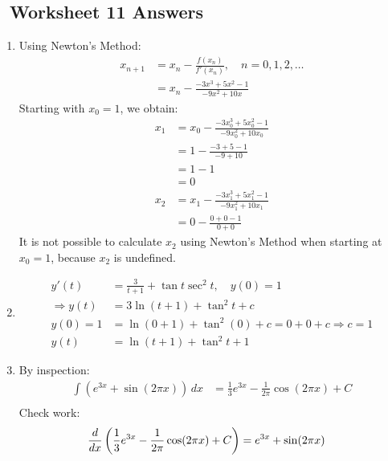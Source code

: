 \newpage\subsection*{\Course \ Worksheet 11 Answers}
\begin{enumerate}
    
    \item Using Newton's Method:
    \begin{align*} 
    	x_{n+1} &= x_n - \frac{f(x_n)}{f'(x_n)}, \quad n= 0, 1, 2, \ldots \\
        &= x_n - \frac{-3x^3+5x^2-1}{-9x^2+10x}
    \end{align*}
    Starting with $x_0 = 1$, we obtain: 
    \begin{align*} 
    	x_{1} 
        &= x_0 - \frac{-3x_0^3+5x_0^2-1}{-9x_0^2+10x_0} \\
        &= 1 - \frac{-3+5-1}{-9+10} \\
        &= 1 - 1 \\
        &= 0\\
        x_2
        &= x_1 - \frac{-3x_1^3+5x_1^2-1}{-9x_1^2+10x_1} \\
        &= 0 - \frac{0 + 0 -1}{0 + 0}
    \end{align*}    
    It is not possible to calculate $x_2$ using Newton's Method when starting at $x_0=1$, because $x_2$ is undefined.  
    
    \item 
    \begin{align*} 
    	y'(t) &= \frac{3}{t+1} + \tan t \sec^2 t, \quad y(0) = 1 \\
        \Rightarrow y(t) &= 3 \ln(t+1) + \tan^2 t + c \\
        y(0) = 1 &= \ln(0+1) + \tan^2(0) + c = 0 + 0 + c \Rightarrow c = 1 \\
        y(t) &= \ln(t+1) + \tan^2 t + 1
    \end{align*}
    
    \item By inspection: 
    \begin{align*}
    	\int \left( e^{3x} + \sin(2 \pi x) \right) \,dx
        &= \frac 1 3 e^{3x} - \frac{1}{2\pi} \cos(2\pi x) + C \\
    \end{align*}
    Check work: 
    \begin{align*}
    	\frac{d}{dx} \left( \frac 1 3 e^{3x} - \frac{1}{2\pi} \cos(2\pi x) + C \right) 
        &= e^{3x} + \sin(2 \pi x)
    \end{align*}    
   

\end{enumerate}
